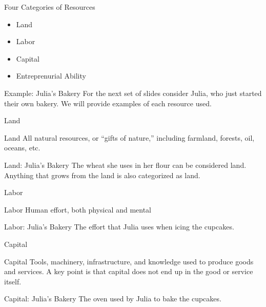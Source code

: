 \documentclass{beamer}
\begin{document}
\begin{frame}{Four Categories of Resources}

\begin{itemize}
\item Land
\item Labor
\item Capital
\item Entreprenurial Ability
\end{itemize}

\begin{exampleblock}{Example: Julia's Bakery}
For the next set of slides consider Julia, who just started their own bakery. We will provide examples of each resource used.
\end{exampleblock}

\end{frame}



\begin{frame}{Land}

\begin{block}{Land}
All natural resources, or ``gifts of nature,'' including farmland, forests, oil, oceans, etc.
\end{block}

\begin{exampleblock}{Land: Julia's Bakery}
The wheat she uses in her flour can be considered land. Anything that grows from the land is also categorized as land.
\end{exampleblock}

\end{frame}

\begin{frame}{Labor}

\begin{block}{Labor}
Human effort, both physical and mental
\end{block}

\begin{exampleblock}{Labor: Julia's Bakery}
The effort that Julia uses when icing the cupcakes.
\end{exampleblock}

\end{frame}

\begin{frame}{Capital}

\begin{block}{Capital}
Tools, machinery, infrastructure, and knowledge used to produce goods and services. A key point is that capital does not end up in the good or service itself.
\end{block}

\begin{exampleblock}{Capital: Julia's Bakery}
The oven used by Julia to bake the cupcakes.
\end{exampleblock}

\end{frame}
\end{document}

